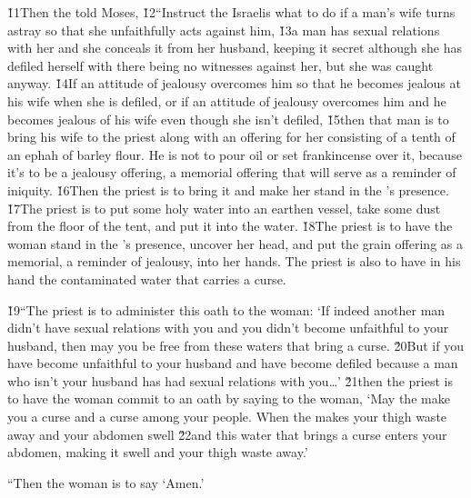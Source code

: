 \v{11}Then the  told Moses, \v{12}``Instruct the Israelis what to do if a man's wife turns astray so that she unfaithfully acts against him, \v{13}a man has sexual relations with her and she conceals it from her husband, keeping it secret although she has defiled herself with there being no witnesses against her, but she was caught anyway. \v{14}If an attitude of jealousy overcomes him so that he becomes jealous at his wife when she is defiled, or if an attitude of jealousy overcomes him and he becomes jealous of his wife even though she isn't defiled, \v{15}then that man is to bring his wife to the priest along with an offering for her consisting of a tenth of an ephah of barley flour. He is not to pour oil or set frankincense over it, because it's to be a jealousy offering, a memorial offering that will serve as a reminder of iniquity. \v{16}Then the priest is to bring it and make her stand in the 's presence. \v{17}The priest is to put some holy water into an earthen vessel, take some dust from the floor of the tent, and put it into the water. \v{18}The priest is to have the woman stand in the 's presence, uncover her head, and put the grain offering as a memorial, a reminder of jealousy, into her hands. The priest is also to have in his hand the contaminated water that carries a curse.

\v{19}``The priest is to administer this oath to the woman: `If indeed another man didn't have sexual relations with you and you didn't become unfaithful to your husband, then may you be free from these waters that bring a curse. \v{20}But if you have become unfaithful to your husband and have become defiled because a man who isn't your husband has had sexual relations with you{\ldots}' \v{21}then the priest is to have the woman commit to an oath by saying to the woman, `May the  make you a curse and a curse among your people. When the  makes your thigh waste away and your abdomen swell \v{22}and this water that brings a curse enters your abdomen, making it swell and your thigh waste away.'

``Then the woman is to say `Amen.'

